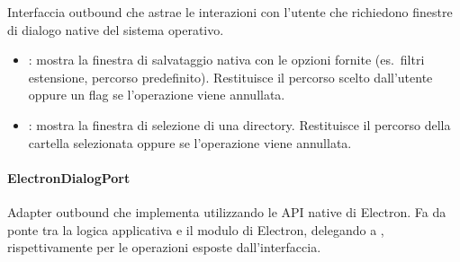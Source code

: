 Interfaccia outbound che astrae le interazioni con l'utente che richiedono 
finestre di dialogo native del sistema operativo.

\begin{itemize}
    \item {} : mostra la finestra di salvataggio nativa con 
    le opzioni fornite (es.\ filtri estensione, percorso predefinito). 
    Restituisce il percorso scelto dall'utente oppure un flag 
     se l'operazione viene annullata.
    \item {} : 
    mostra la finestra di selezione di una directory. Restituisce il percorso 
    della cartella selezionata oppure  se 
    l'operazione viene annullata.
\end{itemize}

\paragraph{ElectronDialogPort}

Adapter outbound che implementa  utilizzando le API 
native di Electron. Fa da ponte tra la logica applicativa e il modulo 
 di Electron, delegando a , 
 rispettivamente per le operazioni esposte dall'interfaccia.